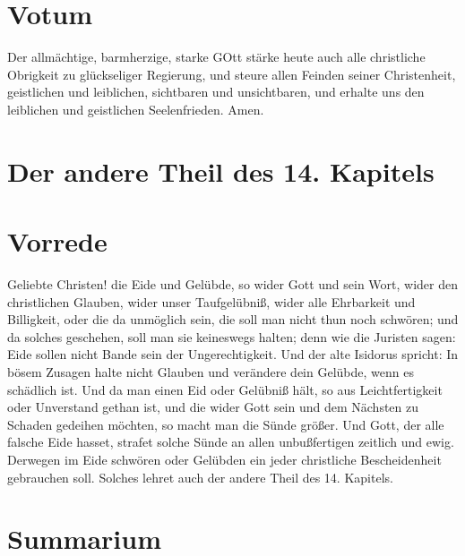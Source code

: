 \section{Votum}

Der allmächtige, barmherzige, starke GOtt stärke heute auch alle christliche Obrigkeit zu glückseliger Regierung, und steure allen Feinden seiner Christenheit, geistlichen und leiblichen, sichtbaren und unsichtbaren, und erhalte uns den leiblichen und geistlichen Seelenfrieden. Amen.

\section{Der andere Theil des 14. Kapitels}

\section{Vorrede}

Geliebte Christen! die Eide und Gelübde, so wider Gott und sein Wort, wider den christlichen Glauben, wider unser Taufgelübniß, wider alle Ehrbarkeit und Billigkeit, oder die da unmöglich sein, die soll man nicht thun noch schwören; und da solches geschehen, soll man sie keineswegs halten; denn wie die Juristen sagen: Eide sollen nicht Bande sein der Ungerechtigkeit. Und der alte Isidorus spricht: In bösem Zusagen halte nicht Glauben und verändere dein Gelübde, wenn es schädlich ist. Und da man einen Eid oder Gelübniß hält, so aus Leichtfertigkeit oder Unverstand gethan ist, und die wider Gott sein und dem Nächsten zu Schaden gedeihen möchten, so macht man die Sünde größer. Und Gott, der alle falsche Eide hasset, strafet solche Sünde an allen unbußfertigen zeitlich und ewig. Derwegen im Eide schwören oder Gelübden ein jeder christliche Bescheidenheit gebrauchen soll. Solches lehret auch der andere Theil des 14. Kapitels.

\section{Summarium}

